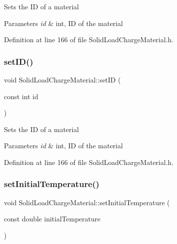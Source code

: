 Sets the ID of a material 
\begin{DoxyParams}{Parameters}
{\em id} & int, ID of the material \\
\hline
\end{DoxyParams}


Definition at line 166 of file Solid\+Load\+Charge\+Material.\+h.

\mbox{\label{class_solid_load_charge_material_a4cc8e12ffb340c94106cecf576a85ae5}} 
\subsubsection{\texorpdfstring{set\+I\+D()}{setID()}\hspace{0.1cm}{\footnotesize\ttfamily [3/3]}}
{\footnotesize\ttfamily void Solid\+Load\+Charge\+Material\+::set\+ID (\begin{DoxyParamCaption}\item[{const int}]{id }\end{DoxyParamCaption})\hspace{0.3cm}{\ttfamily [inline]}}

Sets the ID of a material 
\begin{DoxyParams}{Parameters}
{\em id} & int, ID of the material \\
\hline
\end{DoxyParams}


Definition at line 166 of file Solid\+Load\+Charge\+Material.\+h.

\mbox{\label{class_solid_load_charge_material_ac80e565d26e68e542f4cb41f41b7d96c}} 
\subsubsection{\texorpdfstring{set\+Initial\+Temperature()}{setInitialTemperature()}\hspace{0.1cm}{\footnotesize\ttfamily [1/3]}}
{\footnotesize\ttfamily void Solid\+Load\+Charge\+Material\+::set\+Initial\+Temperature (\begin{DoxyParamCaption}\item[{const double}]{initial\+Temperature }\end{DoxyParamCaption})\hspace{0.3cm}{\ttfamily [inline]}}


